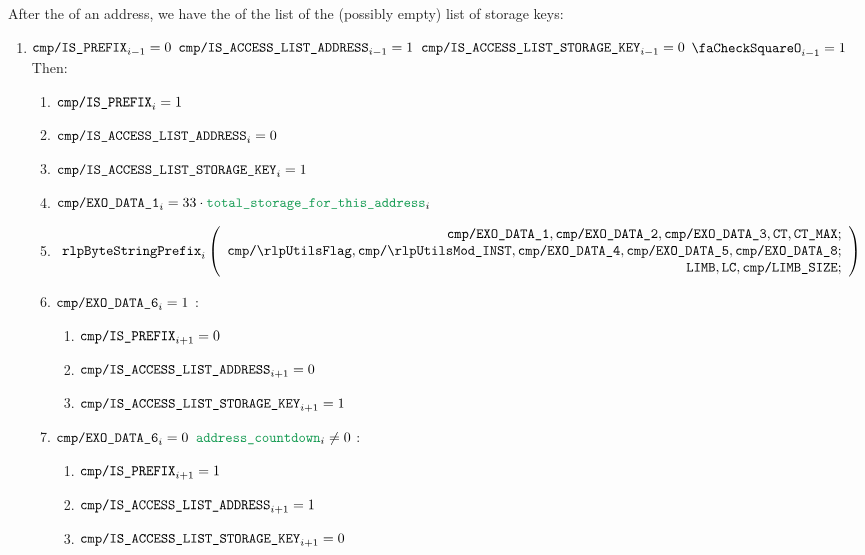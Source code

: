 \begin{enumerate}[resume]
		After the \rlp{} of an address, we have the \rlp{} of the list of the (possibly empty) list of storage keys:
		\begin{enumerate}[resume]
			\item \If $\texttt{cmp}\texttt{/}\texttt{{\texttt{IS\_PREFIX}}} _{i - 1} = 0$ \et $\texttt{cmp}\texttt{/}\texttt{{IS\_ACCESS\_LIST\_ADDRESS}} _{i - 1} = 1$ \et $\texttt{cmp}\texttt{/}\texttt{{IS\_ACCESS\_LIST\_STORAGE\_KEY}} _{i - 1} = 0$ \et $\done _{i - 1} =1$ Then:
				\begin{enumerate}
					\item $\texttt{cmp}\texttt{/}\texttt{{\texttt{IS\_PREFIX}}} _{i} = 1$
					\item $\texttt{cmp}\texttt{/}\texttt{{IS\_ACCESS\_LIST\_ADDRESS}}   _{i} = 0$
					\item $\texttt{cmp}\texttt{/}\texttt{{IS\_ACCESS\_LIST\_STORAGE\_KEY}}    _{i} = 1$
					\item $\rlpTxnComputationColumnExoDataColumn{1} _{i} = 33 \cdot \locTotStorageForThisAddress _{i}$
					\item
						\[
							\rlpBytestringPrefix _{i}
							\left(
							\begin{array}{r}
								\rlpTxnComputationColumnExoDataColumn{1},
								\rlpTxnComputationColumnExoDataColumn{2},
								\rlpTxnComputationColumnExoDataColumn{3},
								\ct,
								\maxCt; \\
								\rlpTxnComputationColumnRlpUtilsFlag,
								\rlpTxnComputationColumnRlpUtilsInstruction,
								\rlpTxnComputationColumnExoDataColumn{4},
								\rlpTxnComputationColumnExoDataColumn{5},
								\rlpTxnComputationColumnExoDataColumn{8}; \\
								\limb,
								\lc,
								\rlpTxnComputationColumnLimbSize; \\
							\end{array}
							\right)
						\]

					\item \If $\texttt{cmp}\texttt{/}\texttt{{\texttt{EXO\_DATA\_6}}} _{i} = 1$ \Then:
						\begin{enumerate}
							\item $\texttt{cmp}\texttt{/}\texttt{{\texttt{IS\_PREFIX}}} _{i + 1} = 0$
							\item $\texttt{cmp}\texttt{/}\texttt{{IS\_ACCESS\_LIST\_ADDRESS}}   _{i + 1} = 0$
							\item $\texttt{cmp}\texttt{/}\texttt{{IS\_ACCESS\_LIST\_STORAGE\_KEY}}    _{i + 1} = 1$
						\end{enumerate}

					\item \If $\texttt{cmp}\texttt{/}\texttt{{\texttt{EXO\_DATA\_6}}} _{i} = 0$ \et $\locAddressPrewarmingCountdown _{i} \neq 0$ \Then:
						\begin{enumerate}
							\item $\texttt{cmp}\texttt{/}\texttt{{\texttt{IS\_PREFIX}}} _{i + 1} = 1$
							\item $\texttt{cmp}\texttt{/}\texttt{{IS\_ACCESS\_LIST\_ADDRESS}}   _{i + 1} = 1$
							\item $\texttt{cmp}\texttt{/}\texttt{{IS\_ACCESS\_LIST\_STORAGE\_KEY}}    _{i + 1} = 0$
						\end{enumerate}


\end{enumerate}
\end{enumerate}
\end{enumerate}
